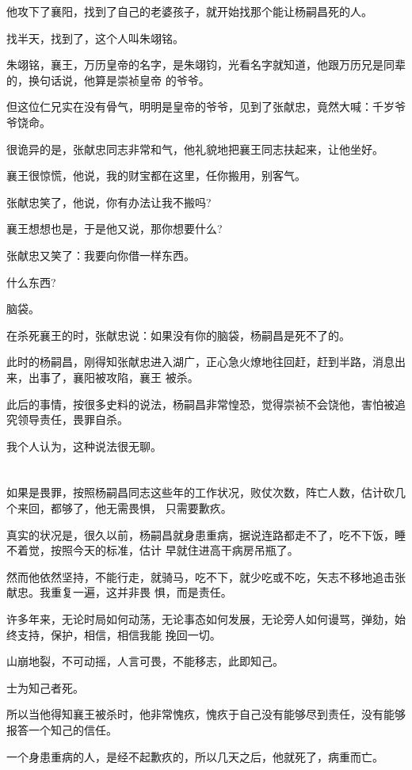 \documentclass[11pt,a4paper,onecolumn]{article}
\begin{document}
他攻下了襄阳，找到了自己的老婆孩子，就开始找那个能让杨嗣昌死的人。

找半天，找到了，这个人叫朱翊铭。

朱翊铭，襄王，万历皇帝的名字，是朱翊钧，光看名字就知道，他跟万历兄是同辈的，换句话说，他算是崇祯皇帝
的爷爷。

但这位仁兄实在没有骨气，明明是皇帝的爷爷，见到了张献忠，竟然大喊：千岁爷爷饶命。

很诡异的是，张献忠同志非常和气，他礼貌地把襄王同志扶起来，让他坐好。

襄王很惊慌，他说，我的财宝都在这里，任你搬用，别客气。

张献忠笑了，他说，你有办法让我不搬吗?

襄王想想也是，于是他又说，那你想要什么?

张献忠又笑了：我要向你借一样东西。

什么东西?

脑袋。

在杀死襄王的时，张献忠说：如果没有你的脑袋，杨嗣昌是死不了的。

此时的杨嗣昌，刚得知张献忠进入湖广，正心急火燎地往回赶，赶到半路，消息出来，出事了，襄阳被攻陷，襄王
被杀。

此后的事情，按很多史料的说法，杨嗣昌非常惶恐，觉得崇祯不会饶他，害怕被追究领导责任，畏罪自杀。

我个人认为，这种说法很无聊。

\section[\thesection]{}

如果是畏罪，按照杨嗣昌同志这些年的工作状况，败仗次数，阵亡人数，估计砍几个来回，都够了，他无需畏惧，
只需要歉疚。

真实的状况是，很久以前，杨嗣昌就身患重病，据说连路都走不了，吃不下饭，睡不着觉，按照今天的标准，估计
早就住进高干病房吊瓶了。

然而他依然坚持，不能行走，就骑马，吃不下，就少吃或不吃，矢志不移地追击张献忠。我重复一遍，这并非畏
惧，而是责任。

许多年来，无论时局如何动荡，无论事态如何发展，无论旁人如何谩骂，弹劾，始终支持，保护，相信，相信我能
挽回一切。

山崩地裂，不可动摇，人言可畏，不能移志，此即知己。

士为知己者死。

所以当他得知襄王被杀时，他非常愧疚，愧疚于自己没有能够尽到责任，没有能够报答一个知己的信任。

一个身患重病的人，是经不起歉疚的，所以几天之后，他就死了，病重而亡。
\end{document}
